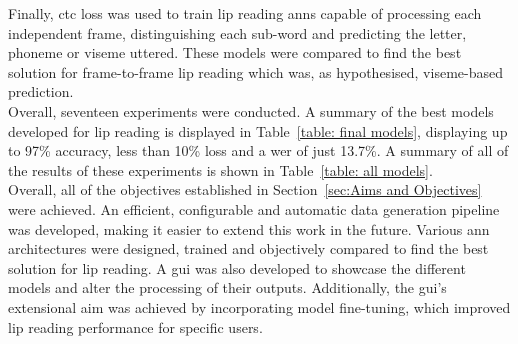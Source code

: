 Finally, \acrfull{ctc} loss was used to train lip reading \acrshort{ann}s capable of processing each independent frame, distinguishing each sub-word and predicting the letter, \gls{phoneme} or \gls{viseme} uttered. These models were compared to find the best solution for frame-to-frame lip reading which was, as hypothesised, \gls{viseme}-based prediction.\\
Overall, seventeen experiments were conducted. A summary of the best models developed for lip reading is displayed in Table~\ref{table: final models}, displaying up to 97\% accuracy, less than 10\% loss and a \acrfull{wer} of just 13.7\%. A summary of all of the results of these experiments is shown in Table~\ref{table: all models}.\\
Overall, all of the objectives established in Section~\ref{sec:Aims and Objectives} were achieved. An efficient, configurable and automatic data generation pipeline was developed, making it easier to extend this work in the future. Various \acrshort{ann} architectures were designed, trained and objectively compared to find the best solution for lip reading. A \acrfull{gui} was also developed to showcase the different models and alter the processing of their outputs. Additionally, the \acrshort{gui}'s extensional aim was achieved by incorporating model fine-tuning, which improved lip reading performance for specific users.
